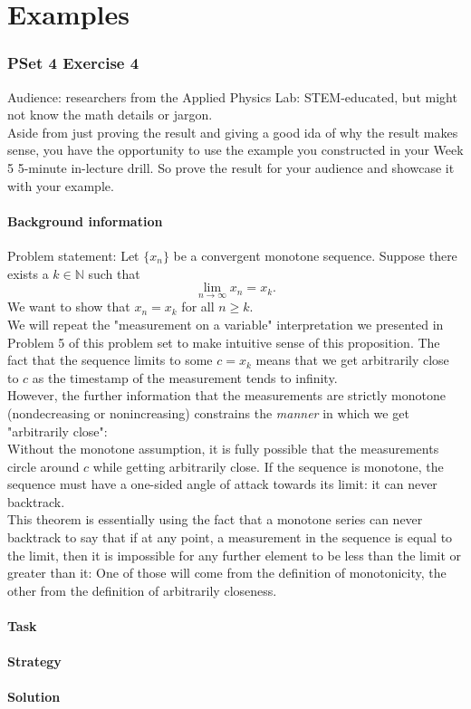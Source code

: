 \documentclass[11 pt]{article}
\begin{document}
\part{Examples}
\section{PSet 4 Exercise 4}
Audience: researchers from the Applied Physics Lab: STEM-educated, but might not know the math details or jargon.\\
Aside from just proving the result and giving a good ida of why the result makes sense, you have the opportunity to use the example you constructed in your Week 5 5-minute in-lecture drill. So prove the result for your audience and showcase it with your example.
\begin{multicols*}{2}
\subsection{Background information}
Problem statement: Let $\{x_n\}$ be a convergent monotone sequence. Suppose there exists a $k\in\mathbb{N}$ such that \[
\lim_{n\to\infty}x_n=x_k
.\] We want to show that $x_n=x_k$ for all $n\geq k$.\\
We will repeat the "measurement on a variable" interpretation we presented in Problem 5 of this problem set to make intuitive sense of this proposition. The fact that the sequence limits to some $c=x_k$ means that we get arbitrarily close to $c$ as the timestamp of the measurement tends to infinity.\\
However, the further information that the measurements are strictly monotone (nondecreasing or nonincreasing) constrains the \emph{manner} in which we get "arbitrarily close":\\
Without the monotone assumption, it is fully possible that the measurements circle around $c$ while getting arbitrarily close. If the sequence is monotone, the sequence must have a one-sided angle of attack towards its limit: it can never backtrack.\\
This theorem is essentially using the fact that a monotone series can never backtrack to say that if at any point, a measurement in the sequence is equal to the limit, then it is impossible for any further element to be less than the limit or greater than it: One of those will come from the definition of monotonicity, the other from the definition of arbitrarily closeness.
\subsection{Task}
\subsection{Strategy}
\columnbreak
\subsection{Solution}
\end{multicols*}
\pagebreak
\end{document}
